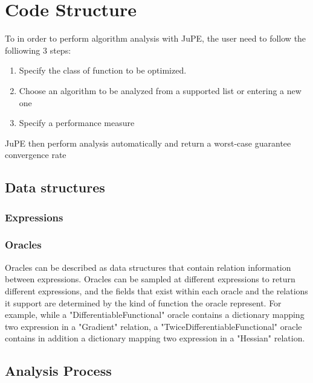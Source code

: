 \chapter{Code Structure}

To in order to perform algorithm analysis with JuPE, the user need to follow the folliowing 3 steps:
\begin{enumerate}
	\item Specify the class of function to be optimized.
	\item Choose an algorithm to be analyzed from a supported list or entering a new one 
	\item Specify a performance measure
  \end{enumerate}
JuPE then perform analysis automatically and return a worst-case guarantee convergence rate
\section{Data structures}
\subsection*{Expressions}
\subsection*{Oracles}
Oracles can be described as data structures that contain relation information between expressions. Oracles can be sampled at different expressions to return different expressions, and the fields that exist within each oracle and the relations it support are determined by the kind of function the oracle represent. For example, while a "DifferentiableFunctional" oracle contains a dictionary mapping two expression in a "Gradient" relation, a "TwiceDifferentiableFunctional" oracle contains in addition a dictionary mapping two expression in a "Hessian" relation.
\section{Analysis Process}
